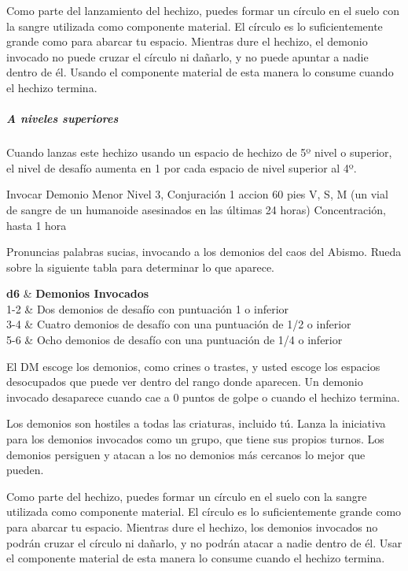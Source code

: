 \documentclass[a4paper,twocolumn,openany,10pt]{dndbook}
\begin{document}
	Como parte del lanzamiento del hechizo, puedes formar un círculo en el suelo con la sangre utilizada como componente
	material. El círculo es lo suficientemente grande como para abarcar tu espacio. Mientras dure el hechizo, el demonio
	invocado no puede cruzar el círculo ni dañarlo, y no puede apuntar a nadie dentro de él. Usando el componente material de
	esta manera lo consume cuando el hechizo termina.

	\subparagraph{A niveles superiores} Cuando lanzas este hechizo usando un espacio de hechizo de 5º nivel o superior, el nivel
	de desafío aumenta en 1 por cada espacio de nivel superior al 4º. 

\spellheader%
	{Invocar Demonio Menor}
	{Nivel 3, Conjuración}
	{1 accion}
	{60 pies}
	{V, S, M (un vial de sangre de un humanoide asesinados en las últimas 24 horas)}
	{Concentración, hasta 1 hora}

	Pronuncias palabras sucias, invocando a los demonios del caos del Abismo. Rueda sobre la siguiente tabla para determinar lo
	que aparece. 
	
	\begin{dndtable}[XXX]
		\textbf{d6}		& \textbf{Demonios Invocados}	\\
		1-2   			& Dos demonios de desafío con puntuación 1 o inferior	\\
		3-4   			& Cuatro demonios de desafío con una puntuación de 1/2 o inferior	\\
		5-6   			& Ocho demonios de desafío con una puntuación de 1/4 o inferior	\\
	\end{dndtable}
	
	El DM escoge los demonios, como crines o trastes, y usted escoge los espacios desocupados que puede ver dentro del rango
	donde aparecen. Un demonio invocado desaparece cuando cae a 0 puntos de golpe o cuando el hechizo termina.
	
	Los demonios son hostiles a todas las criaturas, incluido tú. Lanza la iniciativa para los demonios invocados como un grupo,
	que tiene sus propios turnos. Los demonios persiguen y atacan a los no demonios más cercanos lo mejor que pueden.
	
	Como parte del hechizo, puedes formar un círculo en el suelo con la sangre utilizada como componente material. El círculo es
	lo suficientemente grande como para abarcar tu espacio. Mientras dure el hechizo, los demonios invocados no podrán cruzar el
	círculo ni dañarlo, y no podrán atacar a nadie dentro de él. Usar el componente material de esta manera lo consume cuando el
	hechizo termina.
	
\end{document}
